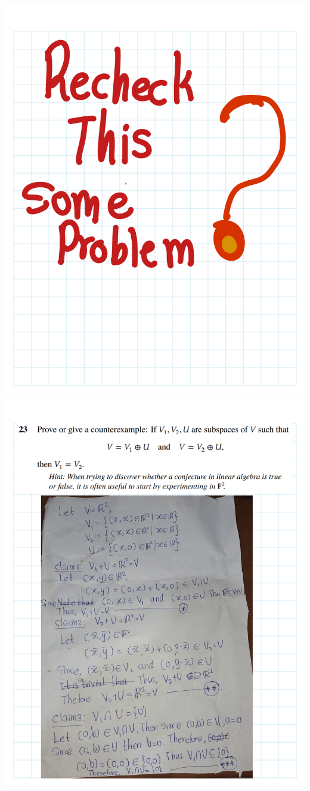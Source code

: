 \documentclass[
]{book}
\theoremstyle{definition}
\theoremstyle{definition}
\theoremstyle{definition}
\theoremstyle{definition}
\theoremstyle{remark}
\begin{document}
\begin{enumerate}
  \includegraphics{fig/Ex1C/Ex/Ex-28.png}
  \includegraphics{fig/Ex1C/Ex/Ex-29.png}

\end{enumerate}
\end{document}
